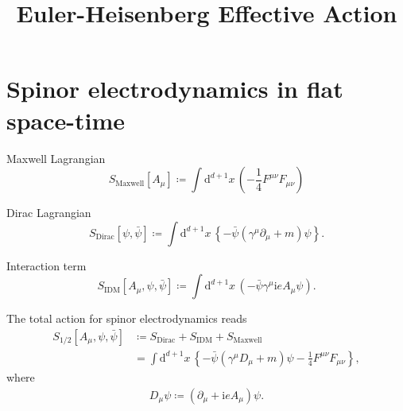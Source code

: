 \documentclass[12pt]{article}
\newcommand\mi{\mathrm{i}} %
\newcommand\dif{\mathrm{d}}
\newcommand{\rbr}[1]{{\left(#1\right)}}
\newcommand{\cbr}[1]{{\left\{#1\right\}}}
\newcommand{\sfun}[2]{{#1}\mathopen{}\left[#2\right]\mathclose{}}
\begin{document}
\title{Euler-Heisenberg Effective Action} 


\date{}







\maketitle

%



\section{Spinor electrodynamics in flat space-time}

Maxwell Lagrangian
\begin{equation}
\sfun{S_\text{Maxwell}}{A_\mu} \coloneqq \int\dif^{d+1} x\,\rbr{
-\frac{1}{4} F^{\mu\nu} F_{\mu\nu} }
\end{equation}

Dirac Lagrangian \citep[sec.~11]{weinberg1995}
\begin{equation}
\sfun{S_\text{Dirac}}{\psi, \bar\psi} \coloneqq \int\dif^{d+1} x\,
\cbr{-\bar{\psi} \rbr{\gamma^\mu\partial_\mu + m}\psi}.
\end{equation}

Interaction term
\begin{equation}
\sfun{S_\text{IDM}}{A_\mu, \psi, \bar\psi} \coloneqq \int\dif^{d+1} 
x\,\rbr{-\bar{\psi}\gamma^\mu\mi e A_\mu\psi}.
\end{equation}

The total action for spinor electrodynamics reads
\begin{align}
\sfun{S_{1/2}}{A_\mu, \psi, \bar\psi} &\coloneqq 
S_\text{Dirac} + S_\text{IDM}+S_\text{Maxwell} \nonumber \\
&= \int\dif^{d+1}x\,\cbr{-\bar\psi\rbr{\gamma^\mu D_\mu+m}\psi
-\frac{1}{4}F^{\mu\nu}F_{\mu\nu}},
\end{align}
where
\begin{align}
D_\mu\psi \coloneqq \rbr{\partial_\mu+\mi e A_\mu}\psi.
\end{align}
\end{document}
